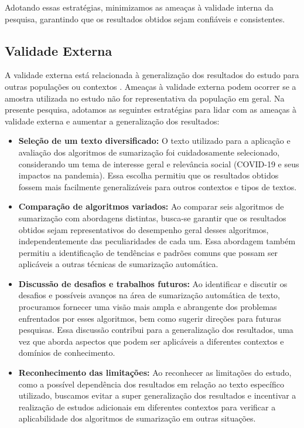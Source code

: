 Adotando essas estratégias, minimizamos as ameaças à validade interna da pesquisa, garantindo que os resultados obtidos sejam confiáveis e consistentes.

\subsection{Validade Externa}
A validade externa está relacionada à generalização dos resultados do estudo para outras populações ou contextos \cite{cook1979quasi}. Ameaças à validade externa podem ocorrer se a amostra utilizada no estudo não for representativa da população em geral. Na presente pesquisa, adotamos as seguintes estratégias para lidar com as ameaças à validade externa e aumentar a generalização dos resultados:

\begin{itemize}
    \item \textbf{Seleção de um texto diversificado:} O texto utilizado para a aplicação e avaliação dos algoritmos de sumarização foi cuidadosamente selecionado, considerando um tema de interesse geral e relevância social (COVID-19 e seus impactos na pandemia). Essa escolha permitiu que os resultados obtidos fossem mais facilmente generalizáveis para outros contextos e tipos de textos.
    \item \textbf{Comparação de algoritmos variados:} Ao comparar seis algoritmos de sumarização com abordagens distintas, busca-se garantir que os resultados obtidos sejam representativos do desempenho geral desses algoritmos, independentemente das peculiaridades de cada um. Essa abordagem também permitiu a identificação de tendências e padrões comuns que possam ser aplicáveis a outras técnicas de sumarização automática.
    \item \textbf{Discussão de desafios e trabalhos futuros:} Ao identificar e discutir os desafios e possíveis avanços na área de sumarização automática de texto, procuramos fornecer uma visão mais ampla e abrangente dos problemas enfrentados por esses algoritmos, bem como sugerir direções para futuras pesquisas. Essa discussão contribui para a generalização dos resultados, uma vez que aborda aspectos que podem ser aplicáveis a diferentes contextos e domínios de conhecimento.
    \item \textbf{Reconhecimento das limitações:} Ao reconhecer as limitações do estudo, como a possível dependência dos resultados em relação ao texto específico utilizado, buscamos evitar a super generalização dos resultados e incentivar a realização de estudos adicionais em diferentes contextos para verificar a aplicabilidade dos algoritmos de sumarização em outras situações.
\end{itemize}


